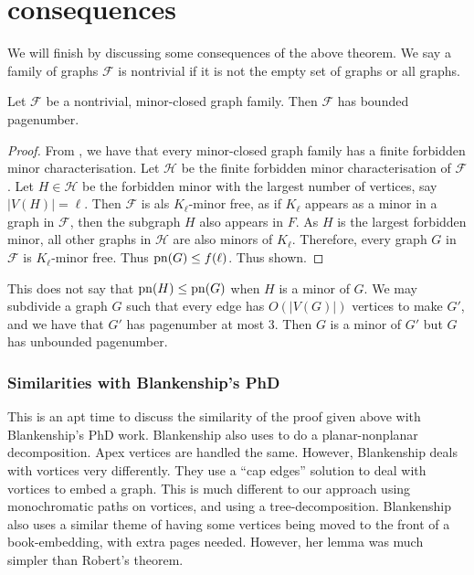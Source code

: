 \chapter{consequences}\label{chap:consequences}

We will finish by discussing some consequences of the above theorem. 
We say a family of graphs $\mathcal{F}$ is nontrivial if it is not the empty set of graphs or all graphs. 

\begin{lemma}\label{lem:Minor-Closed_Pagenumber}
    Let $\mathcal{F}$ be a nontrivial, minor-closed graph family. Then $\mathcal{F}$ has bounded pagenumber.
\end{lemma}
\begin{proof}
    From \textcite{robertsonGraphMinorsXX2004}, we have that every minor-closed graph family has a finite forbidden minor characterisation. Let $\mathcal{H}$ be the finite forbidden minor characterisation of $\mathcal{F}$. Let $H \in \mathcal{H}$ be the forbidden minor with the largest number of vertices, say $|V(H)| = \ell$. Then $\mathcal{F}$ is als $K_\ell$-minor free, as if $K_\ell$ appears as a minor in a graph in $\mathcal{F}$, then the subgraph $H$ also appears in $F$. As $H$ is the largest forbidden minor, all other graphs in $\mathcal{H}$ are also minors of $K_\ell$. Therefore, every graph $G$ in $\mathcal{F}$ is $K_\ell$-minor free. Thus $\operatorname{pn}(G) \leq f(\ell)$. Thus shown.
\end{proof}

This does not say that $\operatorname{pn}(H) \leq \operatorname{pn}(G)$ when $H$ is a minor of $G$. We may subdivide a graph $G$ such that every edge has $O(|V(G)|)$ vertices to make $G'$, and we have that $G'$ has pagenumber at most 3. Then $G$ is a minor of $G'$ but $G$ has unbounded pagenumber.

\subsection{Similarities with Blankenship's PhD}
This is an apt time to discuss the similarity of the proof given above with Blankenship's PhD work. 
Blankenship also uses \textcite{heathPagenumberGenusGraphs1992} to do a planar-nonplanar decomposition. Apex vertices are handled the same. However, Blankenship deals with vortices very differently. They use a ``cap edges'' solution to deal with vortices to embed a graph. This is much different to our approach using monochromatic paths on vortices, and using a tree-decomposition. 
Blankenship also uses a similar theme of having some vertices being moved to the front of a book-embedding, with extra pages needed. However, her lemma was much simpler than Robert's theorem. 